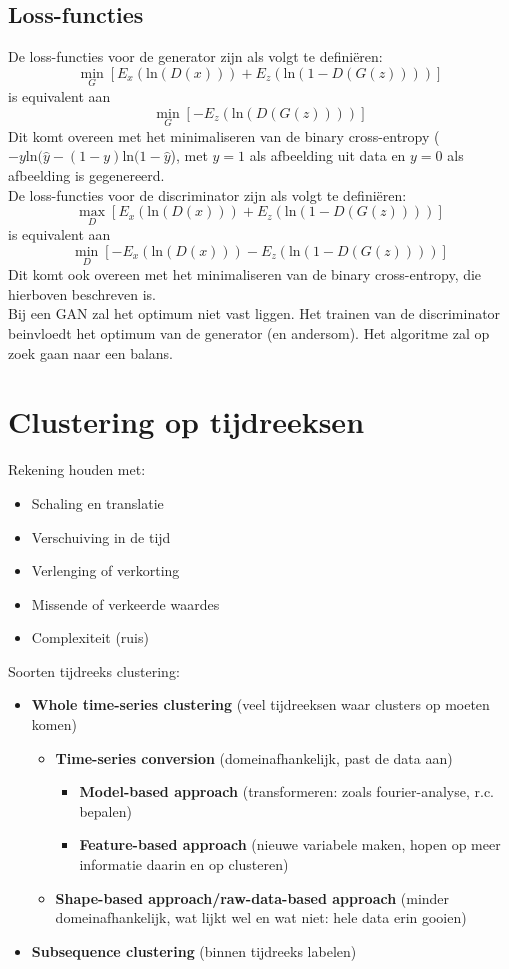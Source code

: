 {\subsection{Loss-functies}
De loss-functies voor de generator zijn als volgt te definiëren:
\[\min_{G}[E_x(\textrm{ln}(D(x)))+E_z(\textrm{ln}(1-D(G(z))))]\]
is equivalent aan 
\[\min_{G}[-E_z(\textrm{ln}(D(G(z))))]\]
Dit komt overeen met het minimaliseren van de binary cross-entropy ($-y\textrm{ln}(\hat{y}-(1-y)\textrm{ln}(1-\hat{y}$), met $y=1$ als afbeelding uit data en $y=0$ als afbeelding is gegenereerd.\\

\noindent De loss-functies voor de discriminator zijn als volgt te definiëren:
\[
\max_{D}[E_x(\textrm{ln}(D(x)))+E_z(\textrm{ln}(1-D(G(z))))]
\]
is equivalent aan
\[\min_{D}[-E_x(\textrm{ln}(D(x)))-E_z(\textrm{ln}(1-D(G(z))))]\]
Dit komt ook overeen met het minimaliseren van de binary cross-entropy, die hierboven beschreven is.\\

\noindent Bij een GAN zal het optimum niet vast liggen. Het trainen van de discriminator beinvloedt het optimum van de generator (en andersom). Het algoritme zal op zoek gaan naar een balans.

\section{Clustering op tijdreeksen}
Rekening houden met:
\begin{itemize}
    \item Schaling en translatie
    \item Verschuiving in de tijd
    \item Verlenging of verkorting
    \item Missende of verkeerde waardes
    \item Complexiteit (ruis)
\end{itemize}
\noindent Soorten tijdreeks clustering:
\begin{itemize}
    \item \textbf{Whole time-series clustering} (veel tijdreeksen waar clusters op moeten komen)
    \begin{itemize}
        \item \textbf{Time-series conversion} (domeinafhankelijk, past de data aan)
        \begin{itemize}
            \item \textbf{Model-based approach} (transformeren: zoals fourier-analyse, r.c. bepalen)
            \item \textbf{Feature-based approach} (nieuwe variabele maken, hopen op meer informatie daarin en op clusteren)
        \end{itemize}
        \item \textbf{Shape-based approach/raw-data-based approach} (minder domeinafhankelijk, wat lijkt wel en wat niet: hele data erin gooien)
    \end{itemize}
    \item \textbf{Subsequence clustering} (binnen tijdreeks labelen)
\end{itemize}
}
